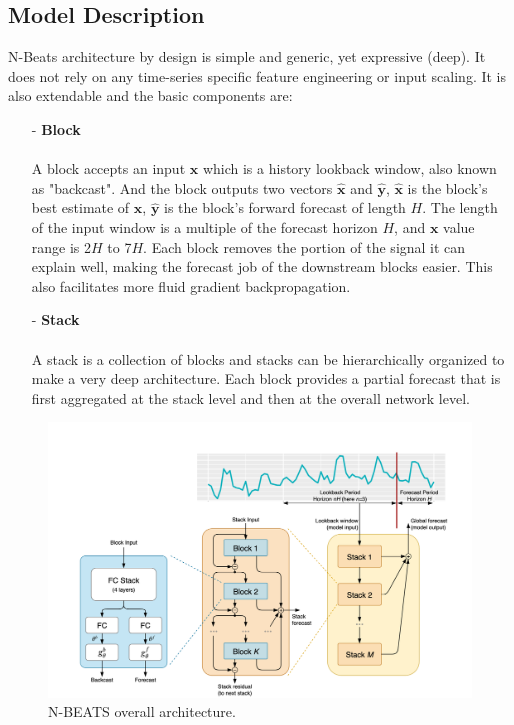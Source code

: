 \documentclass{article}
\newcommand{\vect}[1]{\bm{#1}} %
\begin{document}
\subsection{Model Description}
N-Beats architecture by design is simple and generic, yet expressive (deep). It does not rely on any time-series specific feature engineering or input scaling.
It is also extendable and the basic components are:
\begin{itemize}
 	\item[-]  \textbf{Block}
 	\paragraph{} A block accepts an input $\vect{x}$ which is a history lookback window, also known as "backcast". And the block outputs two vectors $\hat{\vect{x}}$ and $\hat{\vect{y}}$,  $\hat{\vect{x}}$ is the block's best estimate
	of $\vect{x}$, $\hat{\vect{y}}$ is the block's forward forecast of length $H$. The length of the input window is a multiple of the forecast horizon $H$, and $\vect{x}$ value range is 2$H$ to 7$H$. Each block removes the portion of the signal
	it can explain well, making the forecast job of the downstream blocks easier.  This also facilitates more fluid gradient backpropagation.
	\item[-]  \textbf{Stack}
	\paragraph{} A stack is a collection of blocks and stacks can be hierarchically organized to make a very deep architecture. Each block provides a partial forecast that is first aggregated at the stack level and then at the overall network level.
 \end{itemize}

\begin{figure}[!ht]
\centering
	\includegraphics[width=0.6\columnwidth]{n-beats_stack.png} 
\caption{N-BEATS overall architecture.}
\label{fig:nbeatsstack}
\end{figure}
\end{document}
